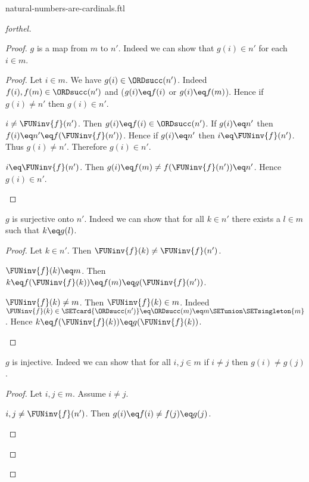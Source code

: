 \documentclass{naproche-library}
\begin{document}
\begin{smodule}[title=Natural Numbers are Cardinal Numbers]{natural-numbers-are-cardinals.ftl}
\begin{proof}[forthel]
\begin{proof}
      $g$ is a map from $m$ to $n'$.
      Indeed we can show that $g(i) \in n'$ for each $i \in m$.
      \begin{proof}
        Let $i \in m$.
        We have $g(i) \in \ORDsucc(n')$.
        Indeed $f(i), f(m) \in \ORDsucc(n')$ and ($g(i) \eq f(i)$ or $g(i) \eq f(m)$).
        Hence if $g(i) \neq n'$ then $g(i) \in n'$.

        \begin{case}{$i \neq \FUNinv{f}(n')$.}
          Then $g(i) \eq f(i) \in \ORDsucc(n')$.
          If $g(i) \eq n'$ then $f(i) \eq n' \eq f(\FUNinv{f}(n'))$.
          Hence if $g(i) \eq n'$ then $i \eq \FUNinv{f}(n')$.
          Thus $g(i) \neq n'$.
          Therefore $g(i) \in n'$.
        \end{case}

        \begin{case}{$i \eq \FUNinv{f}(n')$.}
          Then $g(i)
            \eq f(m)
            \neq f(\FUNinv{f}(n'))
            \eq n'$.
          Hence $g(i) \in n'$.
        \end{case}
      \end{proof}

      $g$ is surjective onto $n'$.
      Indeed we can show that for all $k \in n'$ there exists a $l \in m$ such that $k \eq g(l)$.
      \begin{proof}
        Let $k \in n'$.
        Then $\FUNinv{f}(k) \neq \FUNinv{f}(n')$.

        \begin{case}{$\FUNinv{f}(k) \eq m$.}
          Then $k
            \eq f(\FUNinv{f}(k))
            \eq f(m)
            \eq g(\FUNinv{f}(n'))$.
        \end{case}

        \begin{case}{$\FUNinv{f}(k) \neq m$.}
          Then $\FUNinv{f}(k) \in m$.
          Indeed $\FUNinv{f}(k) \in \SETcard{\ORDsucc(n')} \eq \ORDsucc(m) \eq m \SETunion \SETsingleton{m}$.
          Hence $k
            \eq f(\FUNinv{f}(k))
            \eq g(\FUNinv{f}(k))$.
        \end{case}
      \end{proof}

      $g$ is injective.
      Indeed we can show that for all $i, j \in m$ if $i \neq j$ then $g(i) \neq g(j)$.
      \begin{proof}
        Let $i, j \in m$.
        Assume $i \neq j$.

        \begin{case}{$i, j \neq \FUNinv{f}(n')$.}
          Then $g(i)
            \eq f(i)
            \neq f(j)
            \eq g(j)$.
        \end{case}


\end{proof}
\end{proof}
\end{proof}
\end{smodule}
\end{document}

